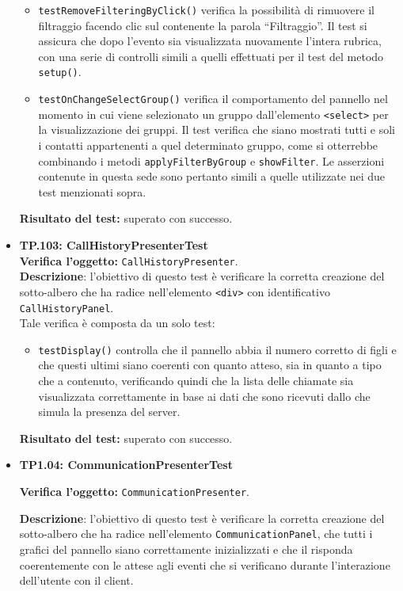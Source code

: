 \begin{itemize}
\begin{itemize}
\item \texttt{testRemoveFilteringByClick()} verifica la possibilità di rimuovere il filtraggio facendo clic sul  contenente la parola ``Filtraggio''. Il test si assicura che dopo l'evento sia visualizzata nuovamente l'intera rubrica, con una serie di controlli simili a quelli effettuati per il test del metodo \verb'setup()'.

\item \texttt{testOnChangeSelectGroup()} verifica il comportamento del pannello nel momento in cui viene selezionato un gruppo dall'elemento \verb'<select>' per la visualizzazione dei gruppi. Il test verifica che siano mostrati tutti e soli i contatti appartenenti a quel determinato gruppo, come si otterrebbe combinando i metodi \verb'applyFilterByGroup' e \verb'showFilter'. Le asserzioni contenute in questa sede sono pertanto simili a quelle utilizzate nei due test menzionati sopra.

\end{itemize}
\textbf{Risultato del test:} superato con successo.

\item[\passed] \textbf{TP.103: CallHistoryPresenterTest}\\
\textbf{Verifica l'oggetto:} \texttt{CallHistoryPresenter}.\\
\textbf{Descrizione}: l'obiettivo di questo test è verificare la corretta creazione del sotto-albero che ha radice nell'elemento \verb'<div>' con identificativo \verb'CallHistoryPanel'.\\
Tale verifica è composta da un solo test:
\begin{itemize}

\item \texttt{testDisplay()} controlla che il pannello abbia il numero corretto di figli e  che questi ultimi siano coerenti con quanto atteso, sia in quanto a tipo che a contenuto, verificando quindi che la lista delle chiamate sia visualizzata correttamente in base ai dati che sono ricevuti dallo  che simula la presenza del server.

\end{itemize}
\textbf{Risultato del test:} superato con successo.


\item[\passed] \textbf{TP1.04: CommunicationPresenterTest}

\textbf{Verifica l'oggetto:} \texttt{CommunicationPresenter}.

\textbf{Descrizione}: l'obiettivo di questo test è verificare la corretta creazione del sotto-albero che ha radice nell'elemento \texttt{CommunicationPanel}, che tutti i  grafici del pannello siano correttamente inizializzati e che il  risponda coerentemente con le attese agli eventi che si verificano durante l'interazione dell'utente con il client.


\end{itemize}
